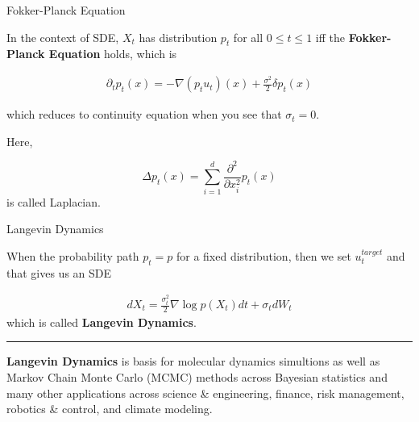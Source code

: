 \documentclass[aspectratio=169,xcolor=dvipsnames,svgnames,x11names,fleqn]{beamer}
\begin{document}
\begin{frame}{Fokker-Planck Equation}

    In the context of SDE, $X_t$ has distribution $p_t$ for all $0\leq t \leq 1$ iff the \textbf{Fokker-Planck Equation} holds, which is 

    \begin{align*}
        \partial_t p_t(x) = -\nabla(p_t u_t)(x) + \frac{\sigma^2}{2}\delta p_t(x)
    \end{align*}

    which reduces to continuity equation when you see that $\sigma_t = 0$.


    Here, 

    $$
    \Delta p_t(x) = \sum_{i=1}^{d} \frac{\partial^2}{\partial x_i^2} p_t(x)
    $$
    is called Laplacian.
    
\end{frame}

\begin{frame}{Langevin Dynamics}

    When the probability path $p_t = p$ for a fixed distribution, then we set $u_t^{target}$ and that gives us an SDE

    \begin{align*}
        dX_t = \frac{\sigma_t^2}{2}\nabla \log p(X_t)dt + \sigma_t dW_t
    \end{align*}
    which is called \textbf{Langevin Dynamics}.

        \vspace{10pt}

    {\color{longTermBlue}\hrule}

    \vspace{10pt}
    
    \textbf{Langevin Dynamics} is basis for molecular dynamics simultions as well as Markov Chain Monte Carlo (MCMC) methods across Bayesian statistics and many other applications across science \& engineering, finance, risk management, robotics \& control, and climate modeling.
    
\end{frame}
\end{document}
